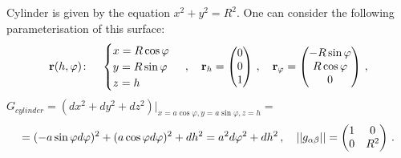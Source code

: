 \documentclass[12pt]{article}
\theoremstyle{theorem}
\numberwithin{equation}{section}
\begin{document}
{ Cylinder is given by the equation $x^2+y^2=R^2$. One can consider the following
parameterisation
 of this surface:
\begin{equation}\label{surface11}
  {\bf r}(h,\varphi)\colon\quad
  \begin{cases}
  x=R\cos\varphi\\
  y=R\sin\varphi\\
  z=h\\
  \end{cases}\,,\quad   {\bf r}_h=
  \begin{pmatrix}
        0\\
        0\\
        1\\
   \end{pmatrix}\,,
\quad
  {\bf r}_\varphi=\begin{pmatrix}
        -R\sin\varphi\\
        R\cos\varphi\\
          0\\
   \end{pmatrix}\,,
\end{equation}
$G_{cylinder}=\left(dx^2+dy^2+dz^2\right)\big\vert_{x=a\cos\varphi,y=a\sin\varphi,z=h}=$
        \begin{equation*}\label{firtsquadraticformcylinder(diff)11}
               =(-a\sin\varphi d\varphi)^2+(a\cos\varphi d\varphi)^2+dh^2=a^2d\varphi^2+dh^2\,,\quad
               ||g_{\alpha\beta}||=
  \begin{pmatrix}
   1 & 0 \\
   0& R^2 \\
   \end{pmatrix}\,.
        \end{equation*}

}
\end{document}
